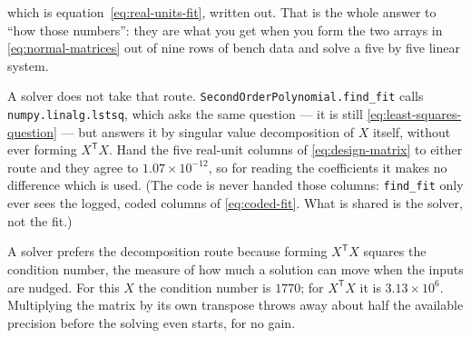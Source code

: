 which is equation~\eqref{eq:real-units-fit}, written out. That is the whole answer to ``how
those numbers'': they are what you get when you form the two arrays in
\eqref{eq:normal-matrices} out of nine rows of bench data and solve a five by five linear
system.

A solver does not take that route. \texttt{SecondOrderPolynomial.\allowbreak find\_fit}
calls \texttt{numpy.\allowbreak linalg.\allowbreak lstsq}, which asks the same question ---
it is still \eqref{eq:least-squares-question} --- but answers it by singular value
decomposition of $X$ itself, without ever forming $X^{\mathsf T}X$. Hand the five real-unit
columns of \eqref{eq:design-matrix} to either route and they agree to
$1.07\times10^{-12}$, so for reading the coefficients it makes no difference which is used.
(The code is never handed those columns: \texttt{find\_fit} only ever sees the logged, coded
columns of \eqref{eq:coded-fit}. What is shared is the solver, not the fit.)

A solver prefers the decomposition route because forming $X^{\mathsf T}X$ squares the
condition number, the measure of how much a solution can move when the inputs are nudged.
For this $X$ the condition number is $1770$; for $X^{\mathsf T}X$ it is
$3.13\times10^{6}$. Multiplying the matrix by its own transpose throws away about half the
available precision before the solving even starts, for no gain.

